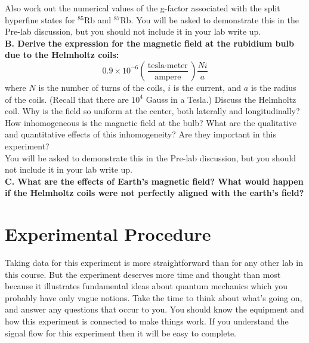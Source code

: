 \documentclass{../lab}
\begin{document}
Also work out the numerical values of the g-factor associated with the split hyperfine states for $^{85}$Rb and $^{87}$Rb. You will be asked to demonstrate this in the Pre-lab discussion, but you should not include it in your lab write up. \\

\noindent\textbf{B. Derive the expression for the magnetic field at the rubidium bulb due to the Helmholtz coils:}
\begin{equation}\label{eq:HelmholtzCoilField}
    0.9 \times 10^{-6} \left(\frac{\textrm{tesla} \cdot \textrm{meter}}{\textrm{ampere}}\right) \frac{N i}{a}
\end{equation}
where $N$ is the number of turns of the coils, $i$ is the current, and $a$ is the radius of the coils. (Recall that there are $10^4$ Gauss in a Tesla.) Discuss the Helmholtz coil. Why is the field so uniform at the center, both laterally and longitudinally? How inhomogeneous is the magnetic field at the bulb? What are the qualitative and quantitative effects of this inhomogeneity? Are they important in this experiment? \\

You will be asked to demonstrate this in the Pre-lab discussion, but you should not include it in your lab write up. \\

\noindent\textbf{C. What are the effects of Earth's magnetic field? What would happen if the Helmholtz coils were not perfectly aligned with the earth's field?}

\section{Experimental Procedure}

Taking data for this experiment is more straightforward than for any other lab in this course. But the experiment deserves more time and thought than most because it illustrates fundamental ideas about quantum mechanics which you probably have only vague notions. Take the time to think about what's going on, and answer any questions that occur to you. You should know the equipment and how this experiment is connected to make things work. If you understand the signal flow for this experiment then it will be easy to complete.
\end{document}
